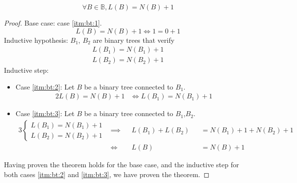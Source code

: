 \begin{theorem}
	\begin{equation*}
		\forall B \in \mathbb{B},L(B)=N(B)+1
	\end{equation*}
\end{theorem}
\begin{proof}
	Base case: case \ref{itm:bt:1}.
	\begin{equation*}
		L(B)=N(B)+1 \iff 1=0+1
	\end{equation*}
	Inductive hypothesis: $B_1$, $B_2$ are binary trees that verify
	\begin{gather*}
		L(B_1)=N(B_1)+1\\
		L(B_2)=N(B_2)+1
	\end{gather*}
	Inductive step:
	\begin{itemize}[label={}]
		\item Case \ref{itm:bt:2}: Let $B$ be a binary tree connected to $B_1$.
			\begin{alignat*}{2}
				L(B)=N(B)+1
				&\iff L(B_1)=N(B_1)+1
			\end{alignat*}
		\item Case \ref{itm:bt:3}: Let $B$ be a binary tree connected to $B_1$,$B_2$.
			\begin{alignat*}{3}
				\begin{cases}
					L(B_1)=N(B_1)+1\\
					L(B_2)=N(B_2)+1
				\end{cases}
				&\implies &&L(B_1)+L(B_2)&&=N(B_1)+1+N(B_2)+1 \\
				&\iff     &&L(B)         &&=N(B)+1
			\end{alignat*}
	\end{itemize}
	Having proven the theorem holds for the base case, and the inductive step for both cases \ref{itm:bt:2} and \ref{itm:bt:3}, we have proven the theorem.
\end{proof}
